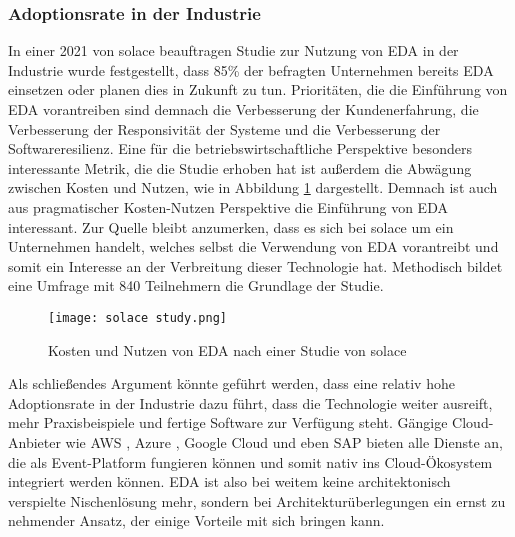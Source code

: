 \subsubsection*{Adoptionsrate in der Industrie}
In einer 2021 von solace beauftragen Studie zur Nutzung von \ac{EDA} in der Industrie wurde festgestellt, dass 85\% der befragten Unternehmen bereits \ac{EDA} einsetzen oder planen dies in Zukunft zu tun. Prioritäten, die die Einführung von \ac{EDA} vorantreiben sind demnach die Verbesserung der Kundenerfahrung, die Verbesserung der Responsivität der Systeme und die Verbesserung der Softwareresilienz. \cite[Vgl.][]{solace2021} Eine für die betriebswirtschaftliche Perspektive besonders interessante Metrik, die die Studie erhoben hat ist außerdem die Abwägung zwischen Kosten und Nutzen, wie in Abbildung \ref{solace} dargestellt. Demnach ist auch aus pragmatischer Kosten-Nutzen Perspektive die Einführung von \ac{EDA} interessant. Zur Quelle bleibt anzumerken, dass es sich bei solace um ein Unternehmen handelt, welches selbst die Verwendung von \ac{EDA} vorantreibt und somit ein Interesse an der Verbreitung dieser Technologie hat.  Methodisch bildet eine Umfrage mit 840 Teilnehmern die Grundlage der Studie.
\begin{figure}[H]
    \centering
    \texttt{[image: solace study.png]}
    \caption[Kosten Nutzen EDA]{Kosten und Nutzen von EDA nach einer Studie von solace \cite[Vgl.][]{solace2021}}
    \label{solace}
  \end{figure}
Als schließendes Argument könnte geführt werden, dass eine relativ hohe Adoptionsrate in der Industrie dazu führt, dass die Technologie weiter ausreift, mehr Praxisbeispiele und fertige Software zur Verfügung steht. Gängige Cloud-Anbieter wie AWS \cite[Vgl.][]{aws2023}, Azure \cite[Vgl.][]{azure2023}, Google Cloud \cite[Vgl.][]{gcp2021} und eben SAP bieten alle Dienste an, die als Event-Platform fungieren können und somit nativ ins Cloud-Ökosystem integriert werden können. \ac*{EDA} ist also bei weitem keine architektonisch verspielte Nischenlösung mehr, sondern bei Architekturüberlegungen ein ernst zu nehmender Ansatz, der einige Vorteile mit sich bringen kann. 